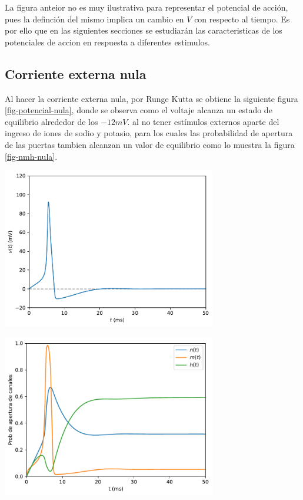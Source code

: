 \documentclass[aps,prl,reprint,groupedaddress]{revtex4-2}
\newenvironment{Figura}
  {\par\medskip\noindent\minipage{\linewidth}}
  {\endminipage\par\medskip}
\begin{document}
La figura anteior no es muy ilustrativa para representar el potencial de acción, 
pues la definción del mismo implica un cambio en $V$ con respecto al tiempo. Es 
por ello que en las siguientes secciones se estudiarán las caracteristicas de los 
potenciales de accion en respuesta a diferentes estimulos.

\subsection{Corriente externa nula}
Al hacer la corriente externa nula, por Runge Kutta se obtiene la siguiente 
figura \ref{fig-potencial-nula}, donde se observa como el voltaje alcanza un estado de
equilibrio alrededor de los $-12 mV$. al no tener estímulos externos aparte del 
ingreso de iones de sodio y potasio, para los cuales las probabilidad de apertura 
de las puertas tambien alcanzan un valor de equilibrio como lo muestra la 
figura \ref{fig-nmh-nula}.

\begin{Figura}
    \centering
    \includegraphics[width=0.7\textwidth]{figs/potencial_vs_t.pdf}
    \label{fig-potencial-nula}
\end{Figura}

\begin{Figura}
    \centering
    \includegraphics[width=0.7\textwidth]{figs/nmh_corriente_externa.pdf}
    \label{fig-nmh-nula}
\end{Figura}
\end{document}
